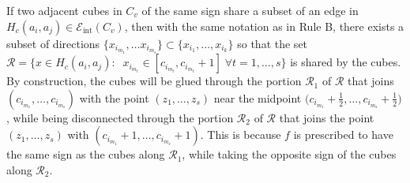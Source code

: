 \documentclass[11pt,reqno]{amsart}
\theoremstyle{definition}
\begin{document}
If two adjacent cubes in $C_v$ of the same sign share a subset of an edge in $H_c(a_i,a_j)\in \mathcal E_{\text{int}}(C_v)$, then with the same notation as in Rule B, there exists a subset of directions $\{x_{i_{m_1}}, \dots x_{i_{m_s}}\}\subset  \{x_{i_1}, \dots, x_{i_k}\}$ so that the set $\mathcal R=\{x \in H_c(a_i,a_j):\;\;x_{i_{m_t}} \in [c_{i_{m_t}}, c_{i_{m_t}}+1]  \; \forall t=1, \dots, s \}$ is shared by the cubes. By construction, the cubes will be glued through the portion $\mathcal R_1$ of $\mathcal R$ that joins $(c_{i_{m_1}}, \dots, c_{i_{m_s}})$ with the point $(z_1, \dots, z_s)$ near the midpoint $\big(c_{i_{m_1}}+\tfrac{1}{2}, \dots,c_{i_{m_s}}+ \tfrac{1}{2}\big)$, while being disconnected through the portion $\mathcal R_2$ of $\mathcal R$ that joins  the point $(z_1, \dots, z_s)$ with $(c_{i_{m_1}}+1, \dots, c_{i_{m_s}}+1)$. This is because $f$ is prescribed to have the same sign as  the cubes along $\mathcal R_1$, while taking the opposite sign of the cubes along $\mathcal R_2$. 
\end{document}
